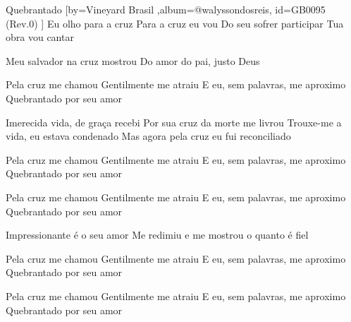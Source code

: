 \beginsong
{Quebrantado %
}[by={Vineyard Brasil %
},album={@walyssondosreis},
id={GB0095 %
(Rev.0) %
}]
Eu olho para a cruz
Para a cruz eu vou
Do seu sofrer participar
Tua obra vou cantar

Meu salvador na cruz mostrou
Do amor do pai, justo Deus

Pela cruz me chamou
Gentilmente me atraiu
E eu, sem palavras, me aproximo
Quebrantado por seu amor

Imerecida vida, de graça recebi
Por sua cruz da morte me livrou
Trouxe-me a vida, eu estava condenado
Mas agora pela cruz eu fui reconciliado

Pela cruz me chamou
Gentilmente me atraiu
E eu, sem palavras, me aproximo
Quebrantado por seu amor

Pela cruz me chamou
Gentilmente me atraiu
E eu, sem palavras, me aproximo
Quebrantado por seu amor

Impressionante é o seu amor
Me redimiu e me mostrou o quanto é fiel

Pela cruz me chamou
Gentilmente me atraiu
E eu, sem palavras, me aproximo
Quebrantado por seu amor

Pela cruz me chamou
Gentilmente me atraiu
E eu, sem palavras, me aproximo
Quebrantado por seu amor


